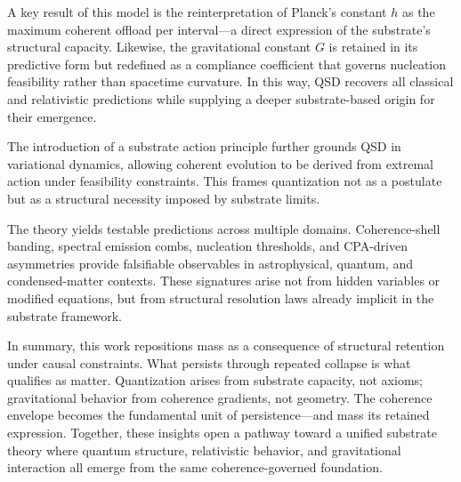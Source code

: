 \documentclass[preprints,article,submit,pdftex,moreauthors]{Definitions/mdpi}
\begin{document}
A key result of this model is the reinterpretation of Planck’s constant \( h \) as the maximum coherent offload per interval—a direct expression of the substrate’s structural capacity. Likewise, the gravitational constant \( G \) is retained in its predictive form but redefined as a compliance coefficient that governs nucleation feasibility rather than spacetime curvature. In this way, QSD recovers all classical and relativistic predictions while supplying a deeper substrate-based origin for their emergence.

The introduction of a substrate action principle further grounds QSD in variational dynamics, allowing coherent evolution to be derived from extremal action under feasibility constraints. This frames quantization not as a postulate but as a structural necessity imposed by substrate limits.

The theory yields testable predictions across multiple domains. Coherence-shell banding, spectral emission combs, nucleation thresholds, and CPA-driven asymmetries provide falsifiable observables in astrophysical, quantum, and condensed-matter contexts. These signatures arise not from hidden variables or modified equations, but from structural resolution laws already implicit in the substrate framework.

In summary, this work repositions mass as a consequence of structural retention under causal constraints. What persists through repeated collapse is what qualifies as matter. Quantization arises from substrate capacity, not axioms; gravitational behavior from coherence gradients, not geometry. The coherence envelope becomes the fundamental unit of persistence—and mass its retained expression. Together, these insights open a pathway toward a unified substrate theory where quantum structure, relativistic behavior, and gravitational interaction all emerge from the same coherence-governed foundation.




\vspace{6pt} 


\end{document}
